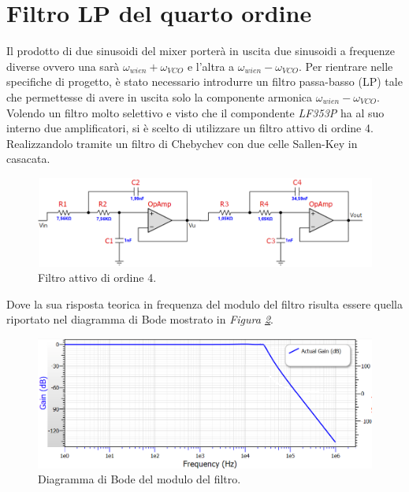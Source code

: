 \documentclass[titlepage]{report}
\begin{document}
\section{Filtro LP del quarto ordine}
	Il prodotto di due sinusoidi del mixer porterà in uscita due sinusoidi a frequenze diverse ovvero una sarà $\omega_{wien} + \omega_{VCO}$ e l'altra a $\omega_{wien} - \omega_{VCO}$. Per rientrare nelle specifiche di progetto, è stato necessario introdurre un filtro passa-basso (LP) tale che permettesse di avere in uscita solo la componente armonica $\omega_{wien} - \omega_{VCO}$.
	\\ 
	Volendo un filtro molto selettivo e visto che il compondente \textit{LF353P} ha al suo interno due amplificatori, si è scelto di utilizzare un filtro attivo di ordine 4. Realizzandolo tramite un filtro di Chebychev con due celle Sallen-Key in casacata. 
	
	\begin{figure}[H]
		\centering
		\includegraphics[scale=0.9]{Immagini/sch_lp4.png}
		\caption{Filtro attivo di ordine 4.}
		\label{fig:LP4}
	\end{figure}	
	
	\noindent Dove la sua risposta teorica in frequenza del modulo del filtro risulta essere quella riportato nel diagramma di Bode mostrato in \textit{Figura \ref{fig:BodeLp4}}.
	
	\begin{figure}[H]
		\centering
		\includegraphics[scale=0.9]{Immagini/bode_teorico_lp4.png}
		\caption{Diagramma di Bode del modulo del filtro.}
		\label{fig:BodeLp4}
	\end{figure}
\end{document}
